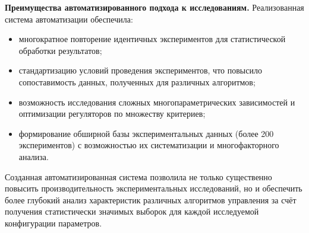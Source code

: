 \textbf{Преимущества автоматизированного подхода к исследованиям.} Реализованная система автоматизации обеспечила:
\begin{itemize}
	\item многократное повторение идентичных экспериментов для статистической обработки результатов;
	\item стандартизацию условий проведения экспериментов, что повысило сопоставимость данных, полученных для различных алгоритмов;
	\item возможность исследования сложных многопараметрических зависимостей и оптимизации регуляторов по множеству критериев;
	\item формирование обширной базы экспериментальных данных (более 200 экспериментов) с возможностью их систематизации и многофакторного анализа.
\end{itemize}

Созданная автоматизированная система позволила не только существенно повысить производительность экспериментальных исследований,
но и обеспечить более глубокий анализ характеристик различных алгоритмов управления за счёт получения статистически значимых выборок для каждой исследуемой конфигурации параметров.

